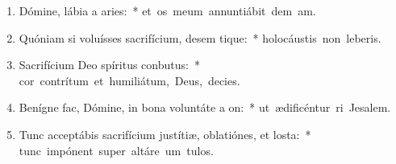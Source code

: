 \begin{flushleft}
\begin{enumerate}[leftmargin=*]
\item Dómine, lábia a aries:~* \mbox{et os meum annuntiábit dem am.}
\item Quóniam si voluísses sacrifícium, desem tique:~* \mbox{holocáustis non leberis.}
\item Sacrifícium Deo spíritus conbutus:~* \mbox{cor contrítum et humiliátum, Deus,  decies.}
\item Benígne fac, Dómine, in bona voluntáte a on:~* \mbox{ut ædificéntur ri Jesalem.}
\item Tunc acceptábis sacrifícium justítiæ, oblatiónes, et losta:~* \mbox{tunc impónent super altáre um tulos.}

\end{enumerate}
\end{flushleft}

